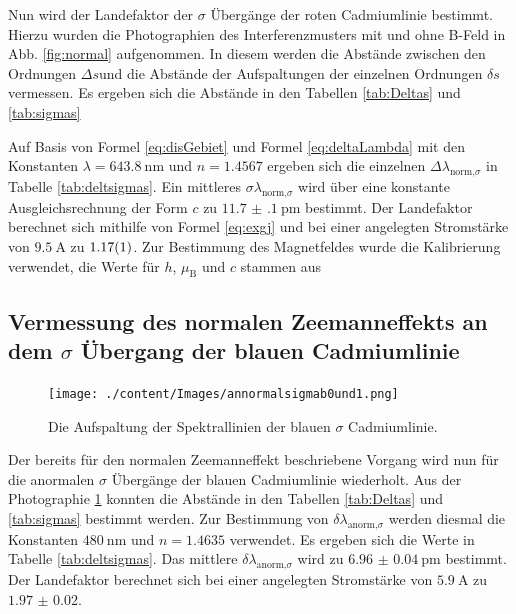 Nun wird der Landefaktor der $\sigma$ Übergänge der roten Cadmiumlinie bestimmt. Hierzu wurden die Photographien des Interferenzmusters mit und ohne B-Feld in Abb. \ref{fig:normal} aufgenommen. In diesem werden die Abstände zwischen den Ordnungen $\Delta s$und die Abstände der Aufspaltungen der einzelnen Ordnungen $\delta s$ vermessen. Es ergeben sich die Abstände in den Tabellen \ref{tab:Deltas} und \ref{tab:sigmas}

Auf Basis von Formel \eqref{eq:disGebiet} und Formel \eqref{eq:deltaLambda} mit den Konstanten $\lambda = \SI{643.8}{\nano\meter}$ und $n = 1.4567$ ergeben sich die einzelnen $\Delta\lambda_{\text{norm,}\sigma}$ in Tabelle \ref{tab:deltsigmas}. Ein mittleres $\sigma\lambda_{\text{norm,}\sigma}$ wird über eine konstante Ausgleichsrechnung der Form $c$ zu $\SI{11.7(1)}{\pico\meter}$ bestimmt. Der Landefaktor berechnet sich mithilfe von Formel \eqref{eq:exgj} und bei einer angelegten Stromstärke von $\SI{9.5}{\ampere}$ %
zu $\num1.17(1) $. Zur Bestimmung des Magnetfeldes wurde die Kalibrierung verwendet, die Werte für $h$, $\mu_\text{B}$ und $c$ stammen aus \cite{scipy}%



\subsection{\texorpdfstring{Vermessung des normalen Zeemanneffekts an dem $\sigma$ Übergang der blauen Cadmiumlinie}{Vermessung des normalen Zeemanneffekts an dem sigma Übergang der blauen Cadmiumlinie}}

\begin{figure}
	\centering
	\texttt{[image: ./content/Images/annormalsigmab0und1.png]}
	\caption{Die Aufspaltung der Spektrallinien der blauen $\sigma$ Cadmiumlinie.}
	\label{fig:anormal1}
\end{figure}


Der bereits für den normalen Zeemanneffekt beschriebene Vorgang wird nun für die anormalen $\sigma$ Übergänge der blauen Cadmiumlinie wiederholt. Aus der Photographie \ref{fig:anormal1} konnten die Abstände in den Tabellen \ref{tab:Deltas} und \ref{tab:sigmas} bestimmt werden. Zur Bestimmung von $\delta\lambda_{\text{anorm,}\sigma}$ werden diesmal die Konstanten $\SI{480}{\nano\meter}$ und $n = 1.4635$ verwendet. Es ergeben sich die Werte in Tabelle \ref{tab:deltsigmas}. Das mittlere $\delta\lambda_{\text{anorm,}\sigma}$ wird zu $\SI{6.96(4)}{\pico\meter}$ bestimmt. Der Landefaktor berechnet sich bei einer angelegten Stromstärke von $\SI{5.9}{\ampere}$ %
zu $\num{1.97(2)}$.




